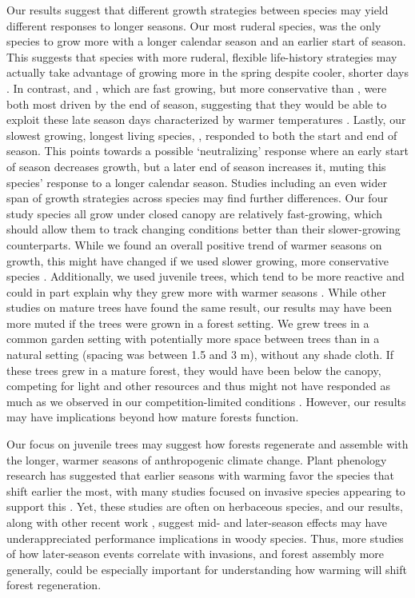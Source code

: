 Our results suggest that different growth strategies between species may yield different responses to longer seasons. Our most ruderal species, {\Ainc} was the only species to grow more with a longer calendar season and an earlier start of season\citep{grime_evidence_1977}. This suggests that species with more ruderal, flexible life-history strategies may actually take advantage of growing more in the spring despite cooler, shorter days \citep{bowmanEcology2023,furlow_alnus_1997,grime_evidence_1977}. In contrast, {\Bpap} and {\Bpop}, which are fast growing, but more conservative than {\Ainc}, were both most driven by the end of season, suggesting that they would be able to exploit these late season days characterized by warmer temperatures \citep{burns_silvics_1990}. Lastly, our slowest growing, longest living species, {\Ball}, responded to both the start and end of season. This points towards a possible `neutralizing' response where an early start of season decreases growth, but a later end of season increases it, muting this species' response to a longer calendar season. Studies including an even wider span of growth strategies across species may find further differences. Our four study species all grow under closed canopy are relatively fast-growing, which should allow them to track changing conditions better than their slower-growing counterparts. While we found an overall positive trend of warmer seasons on growth, this might have changed if we used slower growing, more conservative species \citep[such as \textit{Quercus};][]{burns_silvics_1990}. Additionally, we used juvenile trees, which tend to be more reactive and could in part explain why they grew more with warmer seasons \citep{augspurger_differences_2003,sweeneyComparisonTimingSpring2024}. While other studies on mature trees have found the same result, our results may have been more muted if the trees were grown in a forest setting. We grew trees in a common garden setting with potentially more space between trees than in a natural setting (spacing was between 1.5 and 3 m), without any shade cloth. If these trees grew in a mature forest, they would have been below the canopy, competing for light and other resources and thus might not have responded as much as we observed in our competition-limited conditions \citep{polgar_leafout_2011}. However, our results may have implications beyond how mature forests function. 

Our focus on juvenile trees may suggest how forests regenerate and assemble with the longer, warmer seasons of anthropogenic climate change. Plant phenology research has suggested that earlier seasons with warming favor the species that shift earlier the most, with many studies focused on invasive species appearing to support this \citep{wolkovich_temperaturedependent_2013,zettlemoyer_phenology_2019}. Yet, these studies are often on herbaceous species, and our results, along with other recent work \citep{zani_increased_2020,zohner_effect_2023}, suggest mid- and later-season effects may have underappreciated performance implications in woody species. Thus, more studies of how later-season events correlate with invasions, and forest assembly more generally, could be especially important for understanding how warming will shift forest regeneration.

